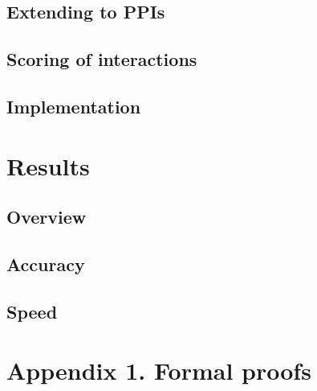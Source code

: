 \documentclass[11pt]{article}
\begin{document}
\subsection*{Extending to PPIs}

\subsection*{Scoring of interactions}

\subsection*{Implementation}

\section*{Results}

\subsection*{Overview}

\subsection*{Accuracy}

\subsection*{Speed}

\section*{Appendix 1. Formal proofs}
\end{document}
